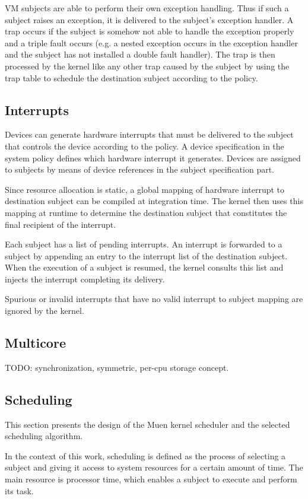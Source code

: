 VM subjects are able to perform their own exception handling. Thus if such a
subject raises an exception, it is delivered to the subject's exception handler.
A trap occurs if the subject is somehow not able to handle the exception
properly and a triple fault occurs (e.g. a nested exception occurs in the
exception handler and the subject has not installed a double fault handler).
The trap is then processed by the kernel like any other trap caused by the
subject by using the trap table to schedule the destination subject according to
the policy.

\subsection{Interrupts}
Devices can generate hardware interrupts that must be delivered to the subject
that controls the device according to the policy. A device specification in the
system policy defines which hardware interrupt it generates. Devices are
assigned to subjects by means of device references in the subject specification
part.

Since resource allocation is static, a global mapping of hardware interrupt to
destination subject can be compiled at integration time. The kernel then uses
this mapping at runtime to determine the destination subject that constitutes
the final recipient of the interrupt.

Each subject has a list of pending interrupts. An interrupt is forwarded to a
subject by appending an entry to the interrupt list of the destination subject.
When the execution of a subject is resumed, the kernel consults this list and
injects the interrupt completing its delivery.

Spurious or invalid interrupts that have no valid interrupt to subject mapping
are ignored by the kernel.

\subsection{Multicore}\label{subsec:multicore}
TODO: synchronization, symmetric, per-cpu storage concept.

\subsection{Scheduling}\label{subsec:scheduling}
This section presents the design of the Muen kernel scheduler and the selected
scheduling algorithm.

In the context of this work, scheduling is defined as the process of selecting
a subject and giving it access to system resources for a certain amount of time.
The main resource is processor time, which enables a subject to execute and
perform its task.

